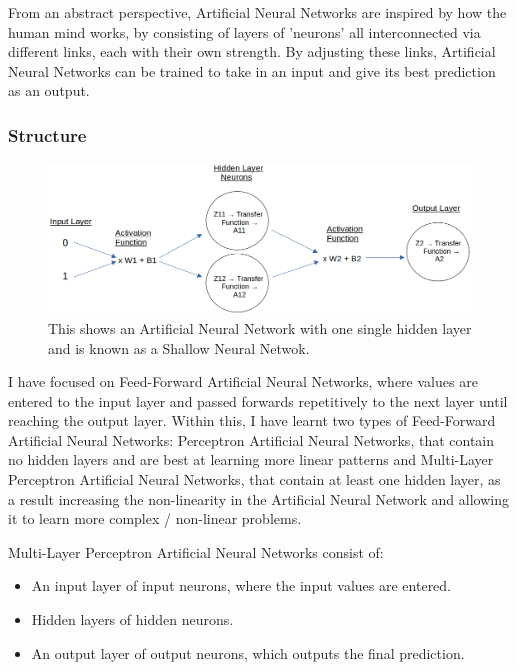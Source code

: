 \documentclass[./project-report/src/latex/project-report.tex]{subfiles}
\begin{document}
From an abstract perspective, Artificial Neural Networks are inspired by how the human mind works, by consisting of layers of 'neurons' all interconnected via 
different links, each with their own strength. By adjusting these links, Artificial Neural Networks can be trained to take in an input and give its best 
prediction as an output.
\vspace{5mm}

\subsubsection{Structure}

\begin{figure}[h!]
\centering
\includegraphics[width=1\textwidth]{./project-report/src/images/shallow-ann-diagram.png}
\caption{This shows an Artificial Neural Network with one single hidden layer and is known as a Shallow Neural Netwok.}
\end{figure}

I have focused on Feed-Forward Artificial Neural Networks, where values are entered to the input layer and passed forwards repetitively to the next layer until 
reaching the output layer. Within this, I have learnt two types of Feed-Forward Artificial Neural Networks: Perceptron Artificial Neural Networks, that contain no 
hidden layers and are best at learning more linear patterns and Multi-Layer Perceptron Artificial Neural Networks, that contain at least one hidden layer, as a result 
increasing the non-linearity in the Artificial Neural Network and allowing it to learn more complex / non-linear problems.
\vspace{5mm}

Multi-Layer Perceptron Artificial Neural Networks consist of:

\begin{itemize}
    \item An input layer of input neurons, where the input values are entered.
    \item Hidden layers of hidden neurons.
    \item An output layer of output neurons, which outputs the final prediction.
\end{itemize}
\end{document}
